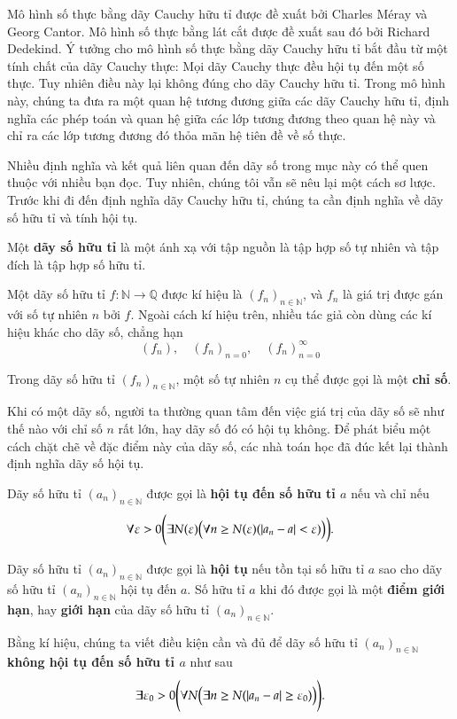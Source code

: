Mô hình số thực bằng dãy Cauchy hữu tỉ được đề xuất bởi Charles M\'{e}ray và Georg Cantor. Mô hình số thực bằng lát cắt được đề xuất sau đó bởi Richard Dedekind. Ý tưởng cho mô hình số thực bằng dãy Cauchy hữu tỉ bắt đầu từ một tính chất của dãy Cauchy thực: Mọi dãy Cauchy thực đều hội tụ đến một số thực. Tuy nhiên điều này lại không đúng cho dãy Cauchy hữu tỉ. Trong mô hình này, chúng ta đưa ra một quan hệ tương đương giữa các dãy Cauchy hữu tỉ, định nghĩa các phép toán và quan hệ giữa các lớp tương đương theo quan hệ này và chỉ ra các lớp tương đương đó thỏa mãn hệ tiên đề về số thực.

Nhiều định nghĩa và kết quả liên quan đến dãy số trong mục này có thể quen thuộc với nhiều bạn đọc. Tuy nhiên, chúng tôi vẫn sẽ nêu lại một cách sơ lược. Trước khi đi đến định nghĩa dãy Cauchy hữu tỉ, chúng ta cần định nghĩa về dãy số hữu tỉ và tính hội tụ.

\begin{definition}
    Một \textbf{dãy số hữu tỉ} là một ánh xạ với tập nguồn là tập hợp số tự nhiên và tập đích là tập hợp số hữu tỉ.

    \noindent Một dãy số hữu tỉ $f: \mathbb{N}\to\mathbb{Q}$ được kí hiệu là ${(f_{n})}_{n\in\mathbb{N}}$, và $f_{n}$ là giá trị được gán với số tự nhiên $n$ bởi $f$. Ngoài cách kí hiệu trên, nhiều tác giả còn dùng các kí hiệu khác cho dãy số, chẳng hạn
    \[
        {(f_{n})}, \quad {(f_{n})}_{n=0}, \quad {(f_{n})}^{\infty}_{n=0}
    \]

    \noindent Trong dãy số hữu tỉ ${(f_{n})}_{n\in\mathbb{N}}$, một số tự nhiên $n$ cụ thể được gọi là một \textbf{chỉ số}.
\end{definition}

Khi có một dãy số, người ta thường quan tâm đến việc giá trị của dãy số sẽ như thế nào với chỉ số $n$ rất lớn, hay dãy số đó có hội tụ không. Để phát biểu một cách chặt chẽ về đặc điểm này của dãy số, các nhà toán học đã đúc kết lại thành định nghĩa dãy số hội tụ.

\begin{definition}
    Dãy số hữu tỉ ${(a_{n})}_{n\in\mathbb{N}}$ được gọi là
    \textbf{hội tụ đến số hữu tỉ $a$} nếu và chỉ nếu
    \[
        \forall \varepsilon > 0 \Biggl(\exists N(\varepsilon)\Bigl(\forall n\geq N(\varepsilon)(\left\vert{a_{n} - a}\right\vert < \varepsilon)\bigr)\biggr).
    \]

    Dãy số hữu tỉ ${(a_{n})}_{n\in\mathbb{N}}$ được gọi là \textbf{hội tụ} nếu tồn tại số hữu tỉ $a$ sao cho dãy số hữu tỉ ${(a_{n})}_{n\in\mathbb{N}}$ hội tụ đến $a$. Số hữu tỉ $a$ khi đó được gọi là một \textbf{điểm giới hạn}, hay \textbf{giới hạn} của dãy số hữu tỉ ${(a_{n})}_{n\in\mathbb{N}}$.

    Bằng kí hiệu, chúng ta viết điều kiện cần và đủ để dãy số hữu tỉ ${(a_{n})}_{n\in\mathbb{N}}$ \textbf{không hội tụ đến số hữu tỉ $a$} như sau
    \[
        \exists\varepsilon_{0} > 0 \Biggl(\forall N\Bigl(\exists n\geq N (\left\vert{a_{n} - a}\right\vert\geq\varepsilon_{0} )\Bigr)\Biggr).
    \]
\end{definition}

